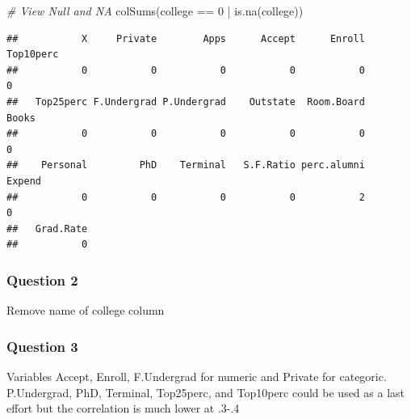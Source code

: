 \documentclass[]{article}
\newenvironment{Shaded}{\begin{snugshade}}{\end{snugshade}}
\newcommand{\CommentTok}[1]{\textcolor[rgb]{0.56,0.35,0.01}{\textit{#1}}}
\newcommand{\ConstantTok}[1]{\textcolor[rgb]{0.00,0.00,0.00}{#1}}
\newcommand{\DecValTok}[1]{\textcolor[rgb]{0.00,0.00,0.81}{#1}}
\newcommand{\DocumentationTok}[1]{\textcolor[rgb]{0.56,0.35,0.01}{\textbf{\textit{#1}}}}
\newcommand{\FunctionTok}[1]{\textcolor[rgb]{0.00,0.00,0.00}{#1}}
\newcommand{\NormalTok}[1]{#1}
\newcommand{\OtherTok}[1]{\textcolor[rgb]{0.56,0.35,0.01}{#1}}
\newcommand{\SpecialCharTok}[1]{\textcolor[rgb]{0.00,0.00,0.00}{#1}}
\newcommand{\StringTok}[1]{\textcolor[rgb]{0.31,0.60,0.02}{#1}}
\begin{document}
\begin{Shaded}
\begin{Highlighting}[]
\CommentTok{\# View Null and NA}
\FunctionTok{colSums}\NormalTok{(college }\SpecialCharTok{==} \DecValTok{0} \SpecialCharTok{|} \FunctionTok{is.na}\NormalTok{(college))}
\end{Highlighting}
\end{Shaded}

\begin{verbatim}
##           X     Private        Apps      Accept      Enroll   Top10perc 
##           0           0           0           0           0           0 
##   Top25perc F.Undergrad P.Undergrad    Outstate  Room.Board       Books 
##           0           0           0           0           0           0 
##    Personal         PhD    Terminal   S.F.Ratio perc.alumni      Expend 
##           0           0           0           0           2           0 
##   Grad.Rate 
##           0
\end{verbatim}

\hypertarget{question-2}{%
\subsubsection{Question 2}\label{question-2}}

Remove name of college column

\begin{Shaded}
\end{Shaded}

\hypertarget{question-3}{%
\subsubsection{Question 3}\label{question-3}}

Variables Accept, Enroll, F.Undergrad for numeric and Private for
categoric. P.Undergrad, PhD, Terminal, Top25perc, and Top10perc could be
used as a last effort but the correlation is much lower at .3-.4

\begin{Shaded}
\end{Shaded}
\end{document}
